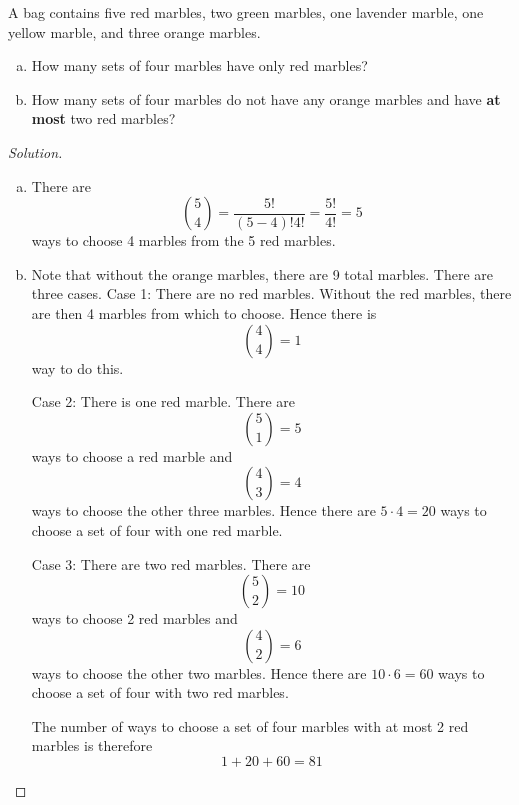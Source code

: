 \documentclass[12pt]{amsart}
\begin{document}
\begin{thm}[10 Points]\label{ex1}
  A bag contains five red marbles, two green marbles, one lavender marble, one yellow marble, and three orange marbles.
  \begin{enumerate}[(a)]
  \item
    How many sets of four marbles have only red marbles?
  \item
    How many sets of four marbles do not have any orange marbles and have {\bf at most} two red marbles?
  \end{enumerate}
  
  \begin{proof}[Solution]
    
    \begin{enumerate}[(a)]
    \item
      There are
      $${5 \choose 4} = \frac{5!}{(5 - 4)!4!} = \frac{5!}{4!} = 5$$
      ways to choose 4 marbles from the 5 red marbles.
    \item
      Note that without the orange marbles, there are 9 total marbles.
      There are three cases.
      Case 1: There are no red marbles.
      Without the red marbles, there are then 4 marbles from which to choose.
      Hence there is  
      $${4 \choose 4} = 1$$
      way to do this.
      
      Case 2: There is one red marble.
      There are
      $${5 \choose 1} = 5$$
      ways to choose a red marble and
      $${4 \choose 3} = 4$$
      ways to choose the other three marbles.
      Hence there are $5 \cdot 4 = 20$ ways to choose a set of four with one red marble.
      
      Case 3: There are two red marbles.
      There are 
      $${5 \choose 2} = 10$$
      ways to choose 2 red marbles and 
      $${4 \choose 2} = 6$$
      ways to choose the other two marbles.
      Hence there are $10 \cdot 6 = 60$ ways to choose a set of four with two red marbles.
      
      The number of ways to choose a set of four marbles with at most 2 red marbles is therefore
      $$1 + 20 + 60 = 81$$
    \end{enumerate}
  \end{proof}
\end{thm}

\newpage

\end{document}
